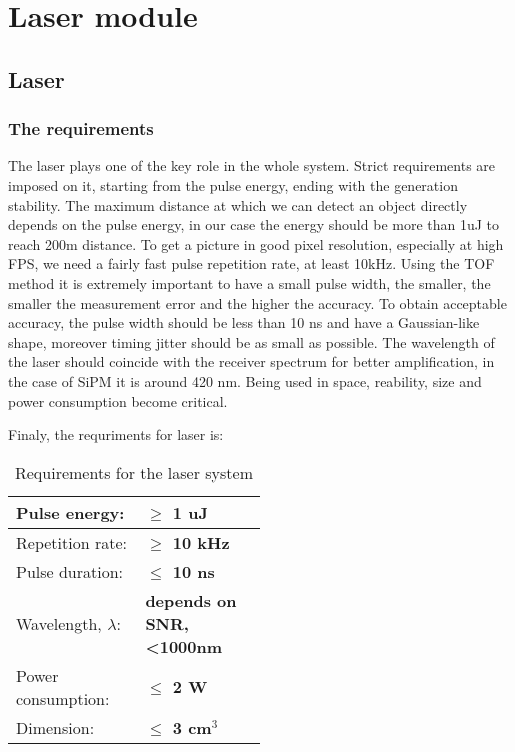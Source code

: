 \section{Laser module}

\subsection{Laser}
\subsubsection{The requirements}
The laser plays one of the key role in the whole system.
Strict requirements are imposed on it, starting from the pulse energy, ending with the generation stability. 
The maximum distance at which we can detect an object directly depends on the pulse energy, in our case the energy should be more than 1uJ to reach 200m distance.
To get a picture in good pixel resolution, especially at high FPS, we need a fairly fast pulse repetition rate, at least 10kHz.
Using the TOF method it is extremely important to have a small pulse width, the smaller, the smaller the measurement error and the higher the accuracy.
To obtain acceptable accuracy, the pulse width should be less than 10 ns and have a Gaussian-like shape, moreover timing jitter should be as small as possible.
The wavelength of the laser should coincide with the receiver spectrum for better amplification, in the case of SiPM it is around 420 nm.
Being used in space, reability, size and power consumption become critical.

Finaly, the requriments for laser is: \\


\begin{table}[H]
\label{tbl:rfp_laser}
\begin{center}

\begin{tabular}{|p{0.2\linewidth}|p{0.3\linewidth}|}
\hline
Pulse energy: & \textbf{$\geq$ 1 uJ}  \\ \hline
Repetition rate: & \textbf{$\geq$ 10 kHz} \\\hline
Pulse duration: & \textbf{$\leq$ 10 ns} \\\hline
Wavelength, $\lambda$: & \textbf{depends on SNR, <1000nm} \\\hline
Power consumption: & \textbf{$\leq$ 2 W} \\  \hline
Dimension: & \textbf{$\leq$ 3 cm$^3$} \\  \hline
\end{tabular}
\caption{Requirements for the laser system}
\end{center}
\end{table}

